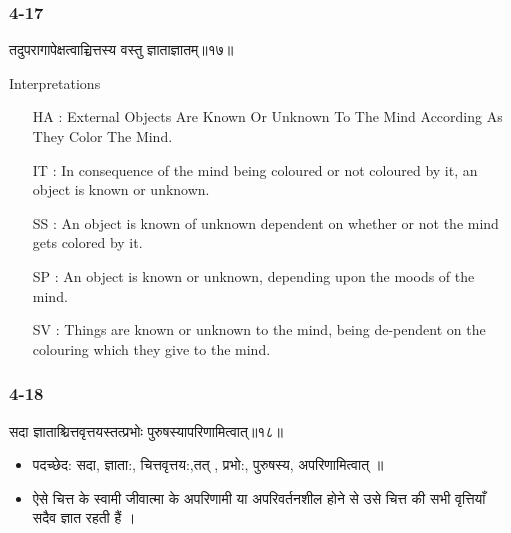 \begin{frame}[fragile]\frametitle{4-17}
\begin{sanskrit}
तदुपरागापेक्षत्वाच्चित्तस्य वस्तु ज्ञाताज्ञातम्॥१७॥
\end{sanskrit}

Interpretations
\begin{itemize}	
\item [HA]: External Objects Are Known Or Unknown To The Mind According As They Color The Mind.
\item [IT]: In consequence of the mind being coloured or not coloured by it, an object is known or unknown.
\item [SS]: An object is known of unknown dependent on whether or not the mind gets colored by it.
\item [SP]: An object is known or unknown, depending upon the moods of the mind.
\item [SV]: Things are known or unknown to the mind, being de-pendent on the colouring which they give to the mind. 
\end{itemize}
\end{frame}


\begin{frame}[fragile]\frametitle{4-18}
\begin{sanskrit}
सदा ज्ञाताश्चित्तवृत्तयस्तत्प्रभोः पुरुषस्यापरिणामित्वात्॥१८॥
\end{sanskrit}

\begin{itemize}
\item पदच्छेद: सदा, ज्ञाता:, चित्तवृत्तय:,तत् , प्रभो:, पुरुषस्य, अपरिणामित्वात् ॥
\item ऐसे चित्त के स्वामी जीवात्मा के अपरिणामी या अपरिवर्तनशील होने से उसे चित्त की सभी वृत्तियाँ सदैव ज्ञात रहती हैं ।
\end{itemize}
\end{frame}



